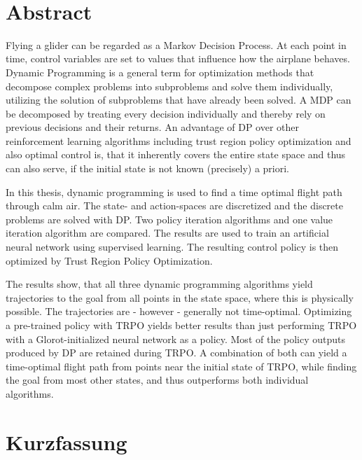 ~\vfill


\section*{Abstract}

Flying a glider can be regarded as a Markov Decision Process. At each point in time, control variables are set to values that influence how the airplane behaves. Dynamic Programming is a general term for optimization methods that decompose complex problems into subproblems and solve them individually, utilizing the solution of subproblems that have already been solved. A MDP can be decomposed by treating every decision individually and thereby rely on previous decisions and their returns. An advantage of DP over other reinforcement learning algorithms including trust region policy optimization and also optimal control is, that it inherently covers the entire state space and thus can also serve, if the initial state is not known (precisely) a priori.

In this thesis, dynamic programming is used to find a time optimal flight path through calm air. The state- and action-spaces are discretized and the discrete problems are solved with DP. Two policy iteration algorithms and one value iteration algorithm are compared. The results are used to train an artificial neural network using supervised learning. The resulting control policy is then optimized by Trust Region Policy Optimization.

The results show, that all three dynamic programming algorithms yield trajectories to the goal from all points in the state space, where this is physically possible. The trajectories are - however - generally not time-optimal. Optimizing a pre-trained policy with TRPO yields better results than just performing TRPO with a Glorot-initialized neural network as a policy. Most of the policy outputs produced by DP are retained during TRPO. A combination of both can yield a time-optimal flight path from points near the initial state of TRPO, while finding the goal from most other states, and thus outperforms both individual algorithms.

\section*{Kurzfassung}

